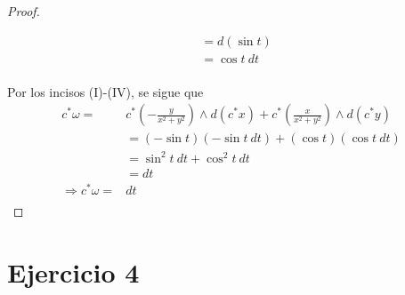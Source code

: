 \documentclass[12pt]{report}
\theoremstyle{largebreak}
\begin{document}
\begin{proof}
\begin{enumerate}
\begin{equation*}
\begin{split}
                    &=d\left(\sin t\right)\\
                    &=\cos t\:dt\\
                \end{split}
            \end{equation*}
        \end{enumerate}
        Por los incisos (I)-(IV), se sigue que
        \begin{equation*}
            \begin{split}
                c^*\omega=&c^*\left(-\frac{y}{x^2+y^2}\right)\wedge d\left(c^*x\right)+c^*\left(\frac{x}{x^2+y^2}\right)\wedge d\left(c^*y\right) \\
                &=(-\sin t)(-\sin t\:dt)+(\cos t)(\cos t\:dt)\\
                &=\sin^2t\:dt+\cos^2t\:dt\\
                &=dt\\
                \Rightarrow c^*\omega=&dt\\
            \end{split}
        \end{equation*}
    \end{proof}

    \newpage

    \renewcommand{\theenumi}{\alph{enumi}}
    \renewcommand{\labelenumi}{{(\theenumi)}}

    \section{Ejercicio 4}
\end{document}
